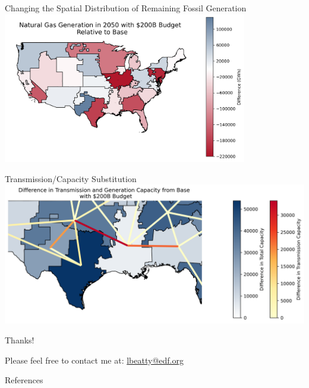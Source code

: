 \documentclass{beamer}
\begin{document}
\begin{frame}{Changing the Spatial Distribution of Remaining Fossil Generation}
\centering
\includegraphics[width=0.8\textwidth]{Figures/EndogenousPaper/naturalgas_generation_map.png}
\end{frame}
\begin{frame}{Transmission/Capacity Substitution}
    \centering
    \includegraphics[width=\textwidth]{Figures/EndogenousPaper/transmission_capacity_substitution.png}
\end{frame}

\begin{frame}{Thanks!}
\label{Thanks}


    Please feel free to contact me at:
    \href{mailto:lbeatty@edf.org}{lbeatty@edf.org}\\
    \vspace{1cm}
\end{frame}

\begin{frame}{References}
\newpage

%

\end{frame}
\end{document}
